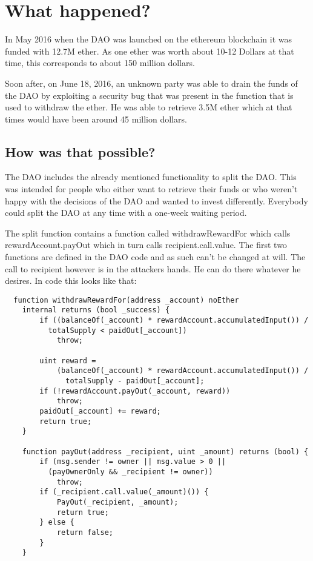 \documentclass[a4paper, 11pt]{scrartcl}
\begin{document}
\section{What happened?}

In May 2016 when the DAO was launched on the ethereum blockchain it was funded with 12.7M ether.
As one ether was worth about 10-12 Dollars at that time, this corresponds to about 150 million dollars.

Soon after, on June 18, 2016, an unknown party was able to drain the funds of the DAO by exploiting a security bug that was present in the function that is used to withdraw the ether.
He was able to retrieve 3.5M ether which at that times would have been around 45 million dollars.

\subsection{How was that possible?}

The DAO includes the already mentioned functionality to split the DAO.
This was intended for people who either want to retrieve their funds or who weren't happy with the decisions of the DAO and wanted to invest differently.
Everybody could split the DAO at any time with a one-week waiting period.

The split function contains a function called withdrawRewardFor which calls rewardAccount.payOut which in turn calls \textunderscore recipient.call.value. The first two functions are defined in the DAO code and as such can't be changed at will. The call to recipient however is in the attackers hands. He can do there whatever he desires. In code this looks like that: \cite{deconstructingDaoAttack}

\begin{verbatim}
  function withdrawRewardFor(address _account) noEther 
    internal returns (bool _success) {
        if ((balanceOf(_account) * rewardAccount.accumulatedInput()) /
          totalSupply < paidOut[_account])
            throw;

        uint reward =
            (balanceOf(_account) * rewardAccount.accumulatedInput()) /
              totalSupply - paidOut[_account];
        if (!rewardAccount.payOut(_account, reward))
            throw;
        paidOut[_account] += reward;
        return true;
    }

    function payOut(address _recipient, uint _amount) returns (bool) {
        if (msg.sender != owner || msg.value > 0 ||
          (payOwnerOnly && _recipient != owner))
            throw;
        if (_recipient.call.value(_amount)()) {
            PayOut(_recipient, _amount);
            return true;
        } else {
            return false;
        }
    }
\end{verbatim}
\end{document}
